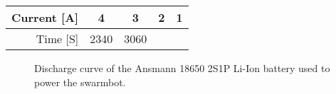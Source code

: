 \begin{table}
  \centering
  \begin{tabular}{|r|c|c|c|c|}
    \hline
    Current [A] & 4 & 3 & 2 & 1 \\
    \hline
    Time [S] & 2340 & 3060 & &  \\
    \hline
  \end{tabular}
\end{table}

\begin{figure}
  \centering
  
  \caption{Discharge curve of the Ansmann 18650 2S1P Li-Ion battery used to power the swarmbot.}
  \label{fig:discharge}
\end{figure}
